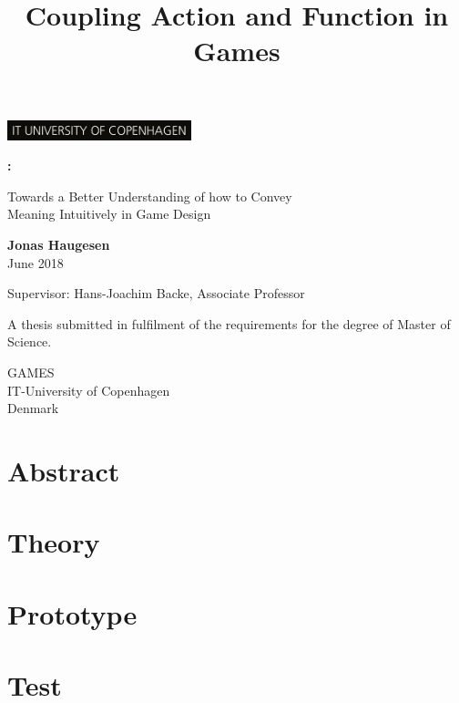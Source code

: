 \documentclass[12pt, twoside]{report}
\title{Coupling Action and Function in Games}
\begin{document}
\begin{titlepage}

  \begin{flushright}
    \includegraphics[width=0.4\textwidth]{ITU_logo}
  \end{flushright}

  \begin{center}

          \vspace*{1cm}

          \Huge\textbf{\thetitle:}

          \vspace{0.5cm}
          \Large Towards a Better Understanding of how to Convey \\
            Meaning Intuitively in Game Design

          \vspace{1.5cm}

          \large
          \textbf{Jonas Haugesen} \\
          \vspace{0.4cm}
          June 2018
          \vfill

          Supervisor: Hans-Joachim Backe, Associate Professor\\

          \vspace{0.4cm}

          A thesis submitted in fulfilment of the requirements
          for the degree of Master of Science.

          \vspace{0.8cm}

          GAMES\\
          IT-University of Copenhagen\\
          Denmark\\
          \vspace{2cm}

      \end{center}
\end{titlepage}

\chapter*{Abstract}


\chapter{Theory}

\chapter{Prototype}

\chapter{Test}


\newpage


\appendix

\end{document}
